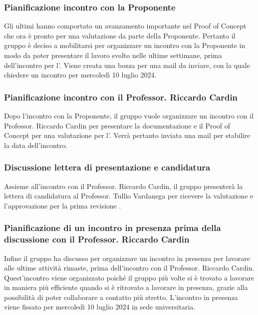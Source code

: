 \subsubsection{Pianificazione incontro con la Proponente}
\par Gli ultimi  hanno comportato un avanzamento importante nel Proof of Concept che ora è pronto per una valutazione da parte della Proponente. 
Pertanto il gruppo è deciso a mobilitarsi per organizzare un incontro con la Proponente in modo da poter presentare il lavoro svolto nelle ultime settimane, prima dell'incontro per l'\RTB. 
Viene creata una bozza per una mail da inviare, con la quale chiedere un incontro per mercoledì 10 luglio 2024.

\subsubsection{Pianificazione incontro con il Professor. Riccardo Cardin}
\par Dopo l'incontro con la Proponente, il gruppo vuole organizzare un incontro con il Professor. Riccardo Cardin per presentare la documentazione e il Proof of Concept per una valutazione per l'\RTB. Verrà pertanto inviata una mail per stabilire la data dell'incontro.

\subsubsection{Discussione lettera di presentazione e candidatura \RTB}
\par Assieme all'incontro con il Professor. Riccardo Cardin, il gruppo presenterà la lettera di candidatura al Professor. Tullio Vardanega per ricevere la valutazione e l'approvazione per la prima revisione \RTB.

\subsubsection{Pianificazione di un incontro in presenza prima della discussione con il Professor. Riccardo Cardin}
\par Infine il gruppo ha discusso per organizzare un incontro in presenza per lavorare alle ultime attività rimaste, prima dell'incontro con il Professor. Riccardo Cardin. Quest'incontro viene organizzato poiché il gruppo più volte si è trovato a lavorare in maniera più efficiente quando si è ritrovato a lavorare in presenza, grazie alla possibilità di poter collaborare a contatto più stretto.
L'incontro in presenza viene fissato per mercoledì 10 luglio 2024 in sede universitaria.